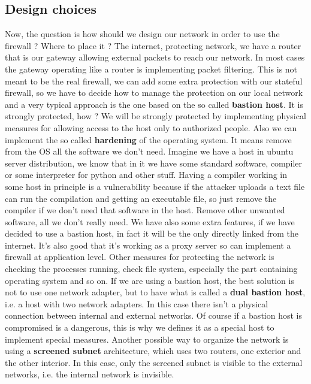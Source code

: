 \documentclass[11pt]{article}
\begin{document}
\subsection{Design choices}
Now, the question is how should we design our network in order to use the firewall ? Where to place it ? The internet, protecting network, we have a router that is our gateway allowing external packets to reach our network. In most cases the gateway operating like a router is implementing packet filtering. This is not meant to be the real firewall, we can add some extra protection with our stateful firewall, so we have to decide how to manage the protection on our local network and a very typical approach is the one based on the so called \textbf{bastion host}. It is strongly protected, how ? We will be strongly protected by implementing physical measures for allowing access to the host only to authorized people. Also we can implement the so called \textbf{hardening} of the operating system. It means remove from the OS all the software we don't need. Imagine we have a host in ubuntu server distribution, we know that in it we have some standard software, compiler or some interpreter for python and other stuff. Having a compiler working in some host in principle is a vulnerability because if the attacker uploads a text file can run the compilation and getting an executable file, so just remove the compiler if we don't need that software in the host. Remove other unwanted software, all we don't really need. We have also some extra features, if we have decided to use a bastion host, in fact it will be the only directly linked from the internet. It's also good that it's working as a proxy server so can implement a firewall at application level. Other measures for protecting the network is checking the processes running, check file system, especially the part containing operating system and so on. If we are using a bastion host, the best solution is not to use one network adapter, but to have what is called a \textbf{dual bastion host}, i.e. a host with two network adapters. In this case there isn't a physical connection between internal and external networks. Of course if a bastion host is compromised is a dangerous, this is why we defines it as a special host to implement special measures. Another possible way to organize the network is using a \textbf{screened subnet} architecture, which uses two routers, one exterior and the other interior. In this case, only the screened subnet is visible to the external networks, i.e. the internal network is invisible.
\end{document}
